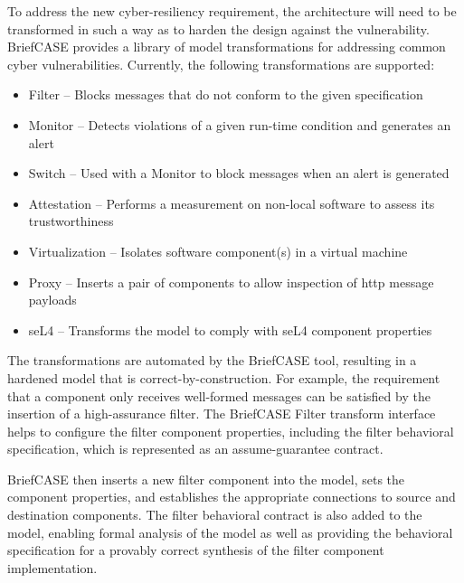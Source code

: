To address the new cyber-resiliency requirement, the architecture will need to be transformed in such a way as to harden the design against the vulnerability.
BriefCASE provides a library of model transformations for addressing common cyber vulnerabilities.  Currently, the following transformations are supported:

\begin{itemize}
	\item Filter -- Blocks messages that do not conform to the given specification
	\item Monitor -- Detects violations of a given run-time condition and generates an alert
	\item Switch -- Used with a Monitor to block messages when an alert is generated
	\item Attestation -- Performs a measurement on non-local software to assess its trustworthiness
	\item Virtualization -- Isolates software component(s) in a virtual machine
	\item Proxy -- Inserts a pair of components to allow inspection of http message payloads
	\item seL4 -- Transforms the model to comply with seL4 component properties
\end{itemize}  

The transformations are automated by the BriefCASE tool, resulting in a hardened model that is correct-by-construction.  
For example, the requirement that a component only receives well-formed messages can be satisfied by the insertion of a high-assurance filter.  
The BriefCASE Filter transform interface 
helps to configure the filter component properties, including the filter behavioral specification, which is represented as an assume-guarantee contract.


BriefCASE then inserts a new filter component into the model, sets the component properties, and establishes the appropriate connections to source and destination components. The filter behavioral contract is also added to the model, enabling formal analysis of the model as well as providing the behavioral specification for a provably correct synthesis of the filter component implementation.

